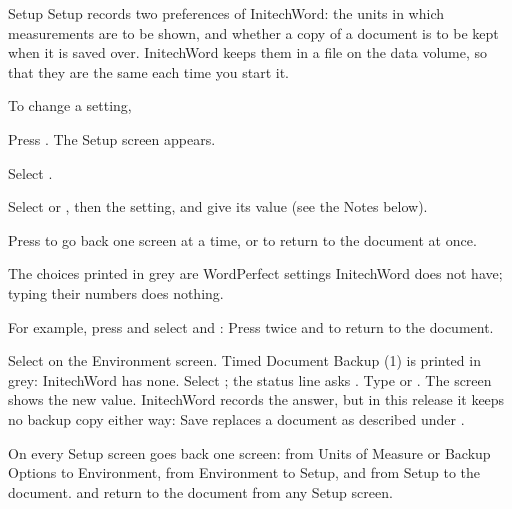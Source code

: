 \begin{Feature}{Setup}
Setup records two preferences of InitechWord: the units in which
measurements are to be shown, and whether a copy of a document is to be kept
when it is saved over.  InitechWord keeps them in a file on the data volume,
so that they are the same each time you start it.

To change a setting,
\begin{WPSteps}
\item Press .  The Setup screen appears.
\item Select .
\item Select  or , then the
setting, and give its value (see the Notes below).
\item Press  to go back one screen at a time, or 
to return to the document at once.
\end{WPSteps}

The choices printed in grey are WordPerfect settings InitechWord does not
have; typing their numbers does nothing.

For example, press  and select
 and :
Press  twice and  to
return to the document.
\EndReplay

\Notes
{}
Select  on the Environment screen.  Timed Document
Backup (1) is printed in grey: InitechWord has none.  Select
; the status line asks
.  Type  or .
The screen shows the new value.
InitechWord records the answer, but in this release it keeps no backup copy
either way: Save replaces a document as described under .

On every Setup screen  goes back one screen: from Units of
Measure or Backup Options to Environment, from Environment to Setup, and
from Setup to the document.   and  return to the
document from any Setup screen.


\end{Feature}
